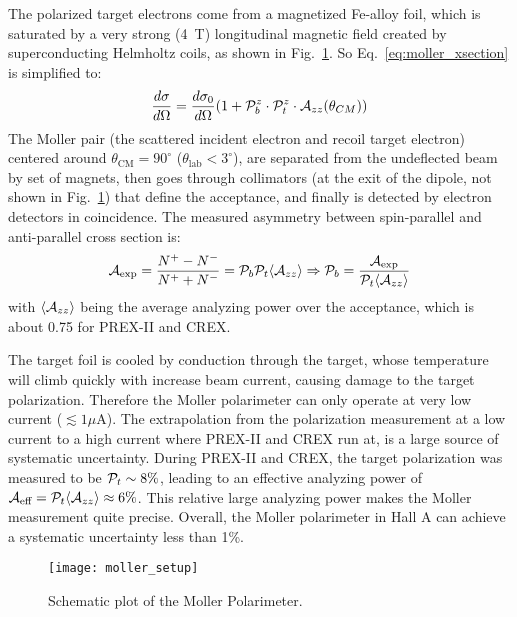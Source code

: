 The polarized target electrons come from a magnetized Fe-alloy foil, which is 
saturated by a very strong (4~T) longitudinal magnetic field created by 
superconducting Helmholtz coils, as shown in Fig.~\ref{fig:moller_polarimeter}. 
So Eq.~\ref{eq:moller_xsection} is simplified to:
\begin{equation}
    \frac{d\sigma}{d\Omega} = \frac{d\sigma_0}{d\Omega} ( 1 + \mathcal{P}_b^z \cdot \mathcal{P}_t^z \cdot \mathcal{A}_{zz}(\theta_{CM}))
    \label{eq:moller_xsection_1}
\end{equation}
The Moller pair (the scattered incident electron and recoil target electron)
centered around $\theta_{\text{CM}} = 90^\circ$ ($\theta_{\text{lab}} < 3^\circ$), 
are separated from the undeflected beam by set of magnets, then goes through
collimators (at the exit of the dipole, not shown in Fig.~\ref{fig:moller_polarimeter}) 
that define the acceptance, and finally is detected by electron detectors in coincidence.
The measured asymmetry between spin-parallel and anti-parallel cross section is:
\begin{equation}
    \mathcal{A}_{\text{exp}} = \frac{N^+ - N^-}{N^+ + N^-} = \mathcal{P}_b \mathcal{P}_t \langle \mathcal{A}_{zz} \rangle 
    \Rightarrow
    \mathcal{P}_b = \frac{\mathcal{A}_{\text{exp}}}{\mathcal{P}_t \langle \mathcal{A}_{zz} \rangle}
\end{equation}
with $\langle \mathcal{A}_{zz} \rangle$ being the average analyzing power over the acceptance,
which is about 0.75 for PREX-II and CREX.

The target foil is cooled by conduction through the target, whose temperature 
will climb quickly with increase beam current, causing damage to the target
polarization. Therefore the Moller polarimeter can only operate at very low current ($\lesssim 1\mu$A).
The extrapolation from the polarization measurement at a low current to a high current
where PREX-II and CREX run at, is a large source of systematic uncertainty.
During PREX-II and CREX, the target polarization was measured to be $\mathcal{P}_t \sim 8\%$,
leading to an effective analyzing power of $\mathcal{A}_{\text{eff}} = \mathcal{P}_t\langle \mathcal{A}_{zz} \rangle \approx 6\%$.
This relative large analyzing power makes the Moller measurement quite precise.
Overall, the Moller polarimeter in Hall A can achieve a systematic uncertainty less
than 1\%.

\begin{figure}[!h]
    \centering
    \texttt{[image: moller\_setup]}
    \caption{Schematic plot of the Moller Polarimeter.}
    \label{fig:moller_polarimeter}
\end{figure}

